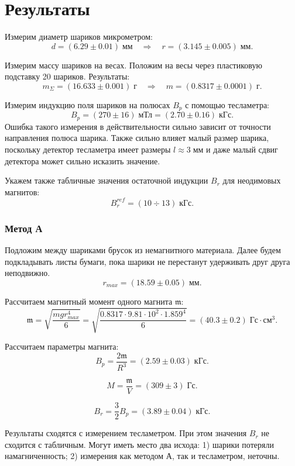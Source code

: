 \documentclass[12pt,a4paper]{article}
\begin{document}
	\section*{Результаты}
	
	Измерим диаметр шариков микрометром:
	$$ d = (6.29 \pm 0.01) \; \text{мм} \quad \Rightarrow \quad r = (3.145 \pm 0.005) \; \text{мм}. $$
	
	Измерим массу шариков на весах. Положим на весы через пластиковую подставку 20 шариков. Результаты:
	$$ m_\Sigma = (16.633 \pm 0.001) \; \text{г} \quad \Rightarrow \quad m = (0.8317 \pm 0.0001) \; \text{г}. $$
	
	Измерим индукцию поля шариков на полюсах $B_p$ с помощью тесламетра:
	$$ B_p = (270 \pm 16) \; \text{мТл} = (2.70 \pm 0.16) \; \text{кГс}. $$
	Ошибка такого измерения в действительности сильно зависит от точности направления полюса шарика. Также сильно влияет малый размер шарика, поскольку детектор тесламетра имеет размеры $l \approx 3 \; \text{мм}$ и даже малый сдвиг детектора может сильно исказить значение.
	
	Укажем также табличные значения остаточной индукции $B_r$ для неодимовых магнитов:
	$$ B_r^{ref} = (10 \div 13) \; \text{кГс}. $$
	
	\subsubsection*{Метод А}
	
	Подложим между шариками брусок из немагнитного материала. Далее будем подкладывать листы бумаги, пока шарики не перестанут удерживать друг друга неподвижно.
	$$ r_{max} = (18.59 \pm 0.05 ) \; \text{мм}. $$
	
	Рассчитаем магнитный момент одного магнита $\mathfrak{m}$:
	$$ \mathfrak{m} = \sqrt{\frac{mgr_{max}^4}{6}} = \sqrt{\frac{0.8317 \cdot 9.81 \cdot 10^2 \cdot 1.859^4}{6}} = (40.3 \pm 0.2) \; \text{Гс} \cdot \text{см}^3. $$
	
	Рассчитаем параметры магнита:
	$$ B_p = \frac{2\mathfrak{m}}{R^3} = (2.59 \pm 0.03) \; \text{кГс}. $$
	
	$$ M = \frac{\mathfrak{m}}{V} = (309 \pm 3) \; \text{Гс}. $$
	
	$$ B_r = \frac{3}{2} B_p = (3.89 \pm 0.04) \; \text{кГс}. $$
	
	Результаты сходятся с измерением тесламетром. При этом значения $B_r$ не сходится с табличным. Могут иметь место два исхода: 1) шарики потеряли намагниченность; 2) измерения как методом А, так и тесламетром, неточны.
	
\end{document}
